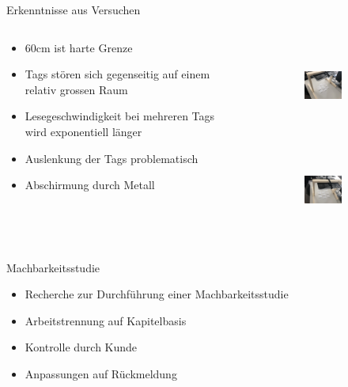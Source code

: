 \documentclass{beamer}
\begin{document}
\begin{frame}{Erkenntnisse aus Versuchen}
\begin{columns}
    \begin{column}{0.5\textwidth}
        \begin{itemize}
            \item 60cm ist harte Grenze
            \item Tags stören sich gegenseitig auf einem relativ grossen Raum
            \item Lesegeschwindigkeit bei mehreren Tags wird exponentiell länger
            \item Auslenkung der Tags problematisch
            \item Abschirmung durch Metall
        \end{itemize}
    \end{column}

    \hfill

    \begin{column}{0.5\textwidth}
        \begin{figure}
            \begin{subfigure}{\textwidth}
                \includegraphics[height=3cm]{img/TagdistanzZueinander01}
            \end{subfigure}
            \begin{subfigure}{\textwidth}
                \includegraphics[height=3cm]{img/TagdistanzZueinander02}
            \end{subfigure}
        \end{figure}
    \end{column}
\end{columns}
\end{frame}
\begin{frame}{Machbarkeitsstudie}
\begin{itemize}
    \item Recherche zur Durchführung einer Machbarkeitsstudie
    \item Arbeitstrennung auf Kapitelbasis
    \item Kontrolle durch Kunde
    \item Anpassungen auf Rückmeldung
\end{itemize}
\end{frame}
\end{document}
